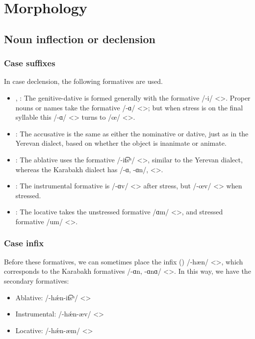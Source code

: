 \section{Morphology}

\subsection{Noun inflection or declension}

\subsubsection{Case suffixes}
In case declension, the following formatives are used. 
\begin{itemize}
	\item {\gen}, {\dat}: The genitive-dative is formed generally with the formative /-i/ <>. Proper nouns or names take the formative /-ɑ/ <>; but when stress is on the final syllable this /-ɑ/ <> turns to /œ/ <>. 
	\item {\acc}: The accusative is the same as either the nominative or dative, just as in the Yerevan dialect, based on whether the object is inanimate or animate.
	\item {\abl}: The ablative uses the formative /-it͡sʰ/ <>, similar to the Yerevan dialect, whereas the Karabakh dialect has /-ɑ, -ɑn/, <>. 
	\item {\ins}: The instrumental formative is /-ɑv/ <> after stress, but /-œv/ <> when stressed. 
	\item {\locgloss}: The locative takes the unstressed formative  /ɑm/ <>, and stressed formative /um/ <>. 
\end{itemize}

\subsubsection{Case infix}
Before these formatives, we can sometimes place the infix () /-hæn/ <>, which corresponds to the Karabakh formatives /-ɑn, -ɑnɑ/ <>. In this way, we have the secondary formatives:\begin{itemize}
	\item Ablative: /-h\'æn-it͡sʰ/ <>
	\item Instrumental: /-h\'æn-æv/ <>
	\item Locative: /-h\'æn-æm/ <>
\end{itemize} 

